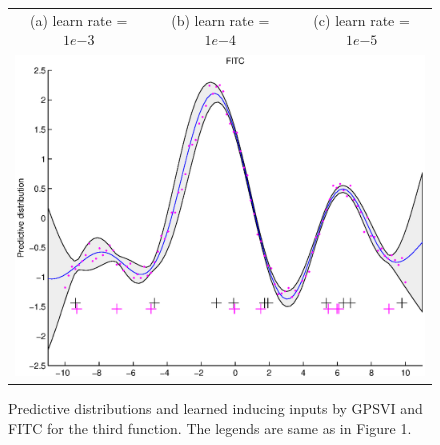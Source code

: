 \documentclass{article} %
\begin{document}
\begin{figure}
\begin{tabular}{ccc}
(a) learn rate = $1e{-3}$ & (b) learn rate = $1e{-4}$ & (c) learn rate = $1e{-5}$ \\
\multicolumn{3}{c}{\includegraphics[scale=0.4]{figures/func3-fitc.eps}}
\end{tabular}
\caption{Predictive distributions and learned inducing inputs by GPSVI and FITC for the third function. The legends are same as in Figure 1.}
\label{fig3}
\end{figure}
\end{document}
